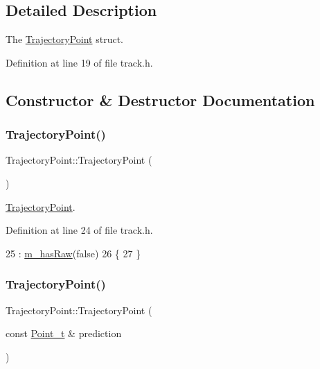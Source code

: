 \subsection{Detailed Description}
The \mbox{\hyperlink{struct_trajectory_point}{Trajectory\+Point}} struct. 

Definition at line 19 of file track.\+h.



\subsection{Constructor \& Destructor Documentation}
\mbox{\label{struct_trajectory_point_a6880ea8ab699f81587357df0dff311af}} 
\subsubsection{\texorpdfstring{Trajectory\+Point()}{TrajectoryPoint()}\hspace{0.1cm}{\footnotesize\ttfamily [1/3]}}
{\footnotesize\ttfamily Trajectory\+Point\+::\+Trajectory\+Point (\begin{DoxyParamCaption}{ }\end{DoxyParamCaption})\hspace{0.3cm}{\ttfamily [inline]}}



\mbox{\hyperlink{struct_trajectory_point}{Trajectory\+Point}}. 



Definition at line 24 of file track.\+h.


\begin{DoxyCode}
25         : \mbox{\hyperlink{struct_trajectory_point_aedf0113745aff30b359a60401ddcf076}{m\_hasRaw}}(\textcolor{keyword}{false})
26     \{
27     \}
\end{DoxyCode}
\mbox{\label{struct_trajectory_point_a7d20d67a7ee073e2536e6ccbbaae1afa}} 
\subsubsection{\texorpdfstring{Trajectory\+Point()}{TrajectoryPoint()}\hspace{0.1cm}{\footnotesize\ttfamily [2/3]}}
{\footnotesize\ttfamily Trajectory\+Point\+::\+Trajectory\+Point (\begin{DoxyParamCaption}\item[{const \mbox{\hyperlink{defines_8h_a8c42696da8f098b91374a8e8bb84b430}{Point\+\_\+t}} \&}]{prediction }\end{DoxyParamCaption})\hspace{0.3cm}{\ttfamily [inline]}}



